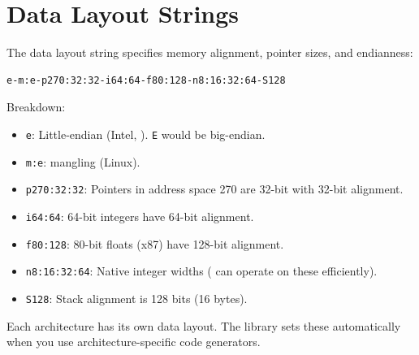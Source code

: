 \section{Data Layout Strings}

The data layout string specifies memory alignment, pointer sizes, and endianness:

\begin{lstlisting}[style=ir]
e-m:e-p270:32:32-i64:64-f80:128-n8:16:32:64-S128
\end{lstlisting}

Breakdown:
\begin{itemize}[noitemsep]
  \item \texttt{e}: Little-endian (Intel, ). \texttt{E} would be big-endian.
  \item \texttt{m:e}:  mangling (Linux).
  \item \texttt{p270:32:32}: Pointers in address space 270 are 32-bit with 32-bit alignment.
  \item \texttt{i64:64}: 64-bit integers have 64-bit alignment.
  \item \texttt{f80:128}: 80-bit floats (x87) have 128-bit alignment.
  \item \texttt{n8:16:32:64}: Native integer widths ( can operate on these efficiently).
  \item \texttt{S128}: Stack alignment is 128 bits (16 bytes).
\end{itemize}

Each architecture has its own data layout. The library sets these automatically when you use architecture-specific code generators.


